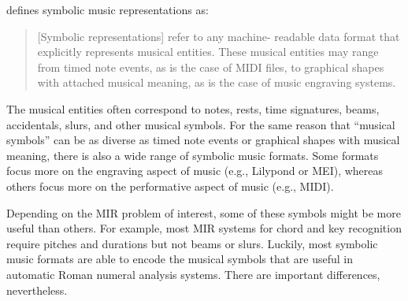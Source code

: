 

\textcite{muller2015music} defines symbolic music
representations as:

\begin{quote}
[Symbolic representations] refer to any machine- readable
data format that explicitly represents musical entities.
These musical entities may range from timed note events, as
is the case of MIDI ﬁles, to graphical shapes with attached
musical meaning, as is the case of music engraving systems.
\end{quote}


The musical entities often correspond to notes, rests, time
signatures, beams, accidentals, slurs, and other musical
symbols. For the same reason that ``musical symbols'' can be
as diverse as timed note events or graphical shapes with
musical meaning, there is also a wide range of symbolic
music formats. Some formats focus more on the engraving
aspect of music (e.g., Lilypond or MEI), whereas others
focus more on the performative aspect of music (e.g., MIDI).

Depending on the MIR problem of interest, some of these
symbols might be more useful than others. For example, most
MIR systems for chord and key recognition require pitches
and durations but not beams or slurs. Luckily, most symbolic
music formats are able to encode the musical symbols that
are useful in automatic Roman numeral analysis systems.
There are important differences, nevertheless.
